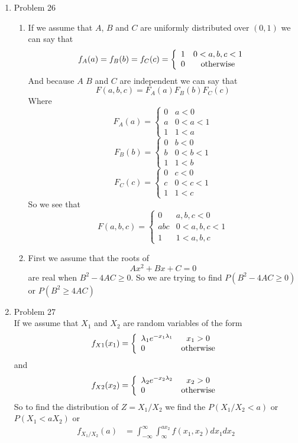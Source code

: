 \documentclass[11pt]{article}
\begin{document}
\begin{enumerate}
\item Problem 26
\begin{enumerate}
\item
If we assume that $A$, $B$ and $C$ are uniformly distributed over $(0,1)$ we can say that
$$f_A(a) = f_B(b) = f_C(c) = \left\{\begin{array}{lc}
			1	&0<a,b,c<1\\
			0	&\textnormal{otherwise}
			\end{array}\right.$$
And because $A$ $B$ and $C$ are independent we can say that
$$F(a,b,c) = F_A(a)F_B(b)F_C(c)$$
Where 
$$F_A(a) = \left\{\begin{array}{lc}
		0	&a<0\\
		a	&0<a<1\\
		1	&1<a
		\end{array}\right.$$
$$F_B(b) = \left\{\begin{array}{lc}
		0	&b<0\\
		b	&0<b<1\\
		1	&1<b
		\end{array}\right.$$
$$F_C(c) = \left\{\begin{array}{lc}
		0	&c<0\\
		c	&0<c<1\\
		1	&1<c
		\end{array}\right.$$
So we see that
$$F(a,b,c) = \left\{\begin{array}{lc}
		0	&a,b,c<0\\
		abc	&0<a,b,c<1\\
		1	&1<a,b,c
		\end{array}\right.$$

\item
First we assume that the roots of 
$$Ax^2+Bx+C = 0$$
are real when $B^2-4AC\ge0$. So we are trying to find $P(B^2-4AC\ge0)$ or $P(B^2\ge4AC)$


\end{enumerate}

\item Problem 27\\
If we assume that $X_1$ and $X_2$ are random variables of the form 
$$f_{X1}(x_1) = \left\{\begin{array}{lc}
		\lambda_1e^{-x_1\lambda_1}	&x_1>0\\
		0				&\textnormal{otherwise}
		\end{array}\right.$$	
and
$$f_{X2}(x_2) = \left\{\begin{array}{lc}
		\lambda_2e^{-x_2\lambda_2}	&x_2>0\\
		0				&\textnormal{otherwise}
		\end{array}\right.$$	
So to find the distribution of $Z = X_1/X_2$ we find the $P(X_1/X_2<a)$ or $P(X_1<aX_2)$ or 
\begin{align*}
f_{X_1/X_2}(a) &= \int_{-\infty}^{\infty}\int_{\infty}^{ax_2}f(x_1,x_2)dx_1dx_2\\
\end{align*}


\end{enumerate}
\end{document}
